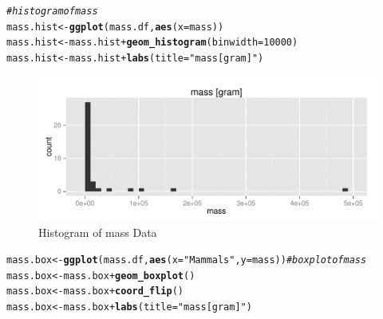 \documentclass{article}\usepackage[]{graphicx}\usepackage[]{color}
\makeatletter
\def\maxwidth{ %
  \ifdim\Gin@nat@width>\linewidth
    \linewidth
  \else
    \Gin@nat@width
  \fi
}
\newcommand{\hlnum}[1]{\textcolor[rgb]{0.686,0.059,0.569}{#1}}%
\newcommand{\hlstr}[1]{\textcolor[rgb]{0.192,0.494,0.8}{#1}}%
\newcommand{\hlcom}[1]{\textcolor[rgb]{0.678,0.584,0.686}{\textit{#1}}}%
\newcommand{\hlopt}[1]{\textcolor[rgb]{0,0,0}{#1}}%
\newcommand{\hlstd}[1]{\textcolor[rgb]{0.345,0.345,0.345}{#1}}%
\newcommand{\hlkwb}[1]{\textcolor[rgb]{0.69,0.353,0.396}{#1}}%
\newcommand{\hlkwc}[1]{\textcolor[rgb]{0.333,0.667,0.333}{#1}}%
\newcommand{\hlkwd}[1]{\textcolor[rgb]{0.737,0.353,0.396}{\textbf{#1}}}%
\newenvironment{kframe}{%
 \def\at@end@of@kframe{}%
 \ifinner\ifhmode%
  \def\at@end@of@kframe{\end{minipage}}%
  \begin{minipage}{\columnwidth}%
 \fi\fi%
 \def\FrameCommand##1{\hskip\@totalleftmargin \hskip-\fboxsep
 \colorbox{shadecolor}{##1}\hskip-\fboxsep
     \hskip-\linewidth \hskip-\@totalleftmargin \hskip\columnwidth}%
 \MakeFramed {\advance\hsize-\width
   \@totalleftmargin\z@ \linewidth\hsize
   \@setminipage}}%
 {\par\unskip\endMakeFramed%
 \at@end@of@kframe}
\newenvironment{knitrout}{}{} %
\makeatother
\begin{document}
\begin{enumerate}
\begin{enumerate}
\begin{knitrout}
\color{fgcolor}\begin{kframe}
\begin{alltt}
\hlcom{# histogram of mass}
\hlstd{mass.hist} \hlkwb{<-} \hlkwd{ggplot}\hlstd{(mass.df,} \hlkwd{aes}\hlstd{(}\hlkwc{x} \hlstd{= mass))}
\hlstd{mass.hist} \hlkwb{<-} \hlstd{mass.hist} \hlopt{+} \hlkwd{geom_histogram}\hlstd{(}\hlkwc{binwidth} \hlstd{=} \hlnum{10000}\hlstd{)}
\hlstd{mass.hist} \hlkwb{<-} \hlstd{mass.hist} \hlopt{+} \hlkwd{labs}\hlstd{(}\hlkwc{title} \hlstd{=} \hlstr{"mass [gram]"}\hlstd{)}
\end{alltt}
\end{kframe}
\end{knitrout}

\begin{figure}[H]  \begin{center}
\begin{knitrout}
\color{fgcolor}
\includegraphics[width=\maxwidth]{figure/3p_hist} 

\end{knitrout}
\end{center} \vspace{-0.25in}\caption{Histogram of mass Data} \end{figure}

\begin{knitrout}
\color{fgcolor}\begin{kframe}
\begin{alltt}
\hlstd{mass.box} \hlkwb{<-} \hlkwd{ggplot}\hlstd{(mass.df,} \hlkwd{aes}\hlstd{(}\hlkwc{x} \hlstd{=} \hlstr{"Mammals"}\hlstd{,} \hlkwc{y} \hlstd{= mass))} \hlcom{# boxplot of mass}
\hlstd{mass.box} \hlkwb{<-} \hlstd{mass.box} \hlopt{+} \hlkwd{geom_boxplot}\hlstd{()}
\hlstd{mass.box} \hlkwb{<-} \hlstd{mass.box} \hlopt{+} \hlkwd{coord_flip}\hlstd{()}
\hlstd{mass.box} \hlkwb{<-} \hlstd{mass.box} \hlopt{+} \hlkwd{labs}\hlstd{(}\hlkwc{title} \hlstd{=} \hlstr{"mass [gram]"}\hlstd{)}
\end{alltt}
\end{kframe}
\end{knitrout}


\end{enumerate}
\end{enumerate}
\end{document}
